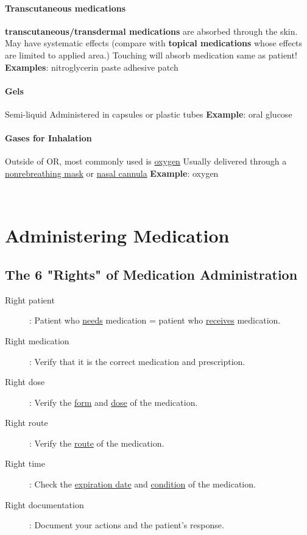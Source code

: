 \documentclass[../../EMT-169.tex]{subfiles}
\begin{document}
\paragraph{Transcutaneous medications}
\begin{outline}	
	\1[] \textbf{transcutaneous/transdermal medications} are absorbed through the skin.
	\2[] May have systematic effects (compare with \textbf{topical medications} whose effects are limited to applied area.)
	\2[] Touching will absorb medication same as patient!
	\2[] \textbf{Examples}:
		\3[] nitroglycerin paste
		\3[] adhesive patch
\end{outline}

\paragraph{Gels}
\begin{outline}	
	\1[] Semi-liquid
	\1[] Administered in capsules or plastic tubes
	\1[] \textbf{Example}:
		\2[] oral glucose
\end{outline}

\paragraph{Gases for Inhalation}
\begin{outline}	
	\1[] Outside of OR, most commonly used is \underline{oxygen}
	\1[] Usually delivered through a \underline{nonrebreathing mask} or \underline{nasal cannula}
	\1[] \textbf{Example}:
		\2[] oxygen
\end{outline}\hfill \\

\section{Administering Medication}
\subsection{The 6 "Rights" of Medication Administration}
\begin{description}
	\item [Right patient]: Patient who \underline{needs} medication = patient who \underline{receives} medication.
	\item [Right medication]: Verify that it is the correct medication and prescription.
	\item [Right dose]: Verify the \underline{form} and \underline{dose} of the medication.
	\item [Right route]: Verify the \underline{route} of the medication.
	\item [Right time]: Check the \underline{expiration date} and \underline{condition} of the medication.
	\item [Right documentation]: Document your actions and the patient’s response.
\end{description}
\end{document}
